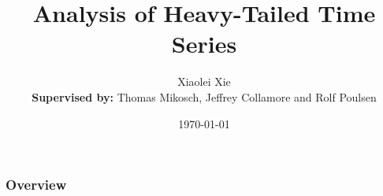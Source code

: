 \documentclass{beamer}
\title{Analysis of Heavy-Tailed Time Series}
\author{
  Xiaolei Xie\\
  \medskip
  {\scriptsize {\bf Supervised by:}  Thomas Mikosch, Jeffrey Collamore and  Rolf Poulsen}
} %
\institute[UCPH] %
{
University of Copenhagen \\ %
\medskip
\textit{xie@math.ku.dk} %
}
\date{\today} %
\begin{document}
\begin{frame}
\titlepage %
\end{frame}



\begin{frame}
\frametitle{Overview}
\tableofcontents
\end{frame}

\end{document}

